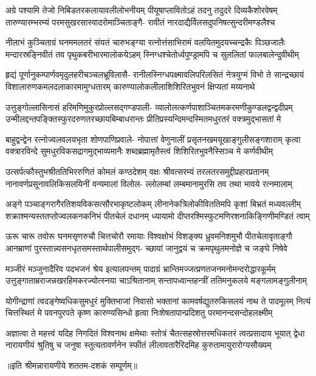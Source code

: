 

\fourlineindentedshloka
{अग्रे पश्यामि तेजो निबिडतरकलायावलीलोभनीयम्}
{पीयूषाप्लावितोऽहं तदनु तदुदरे दिव्यकैशोरवेषम्}
{तारुण्यारम्भरम्यं परमसुखरसास्वादरोमाञ्चिताङ्गै-}
{रावीतं नारदाद्यैर्विलसदुपनिषत्सुन्दरीमण्डलैश्च}

\fourlineindentedshloka
{नीलाभं कुञ्चिताग्रं घनममलतरं संयतं चारुभङ्ग्या}
{रत्नोत्तंसाभिरामं वलयितमुदयच्चन्द्रकैः पिञ्छजालैः}
{मन्दारस्रङ्निवीतं तव पृथुकबरीभारमालोकयेऽहम्}
{स्निग्धश्चेतोर्ध्वपुण्ड्रामपि च सुललितां फालबालेन्दुवीथीम्}

\fourlineindentedshloka
{हृद्यं पूर्णानुकम्पार्णवमृदुलहरीचञ्चलभ्रूविलासै-}
{रानीलस्निग्धपक्ष्मावलिपरिलसितं नेत्रयुग्मं विभो ते}
{सान्द्रच्छायं विशालारुणकमलदलाकारमामुग्धतारम्}
{कारुण्यालोकलीलाशिशिरितभुवनं क्षिप्यतां मय्यनाथे}

\fourlineindentedshloka
{उत्तुङ्गोल्लासिनासं हरिमणिमुकुरप्रोल्लसद्गण्डपाली-}
{व्यालोलत्कर्णपाशाञ्चितमकरमणीकुण्डलद्वन्द्वदीप्रम्}
{उन्मीलद्दन्तपङ्क्तिस्फुरदरुणतरच्छायबिम्बाधरान्तः}
{प्रीतिप्रस्यन्दिमन्दस्मितमधुरतरं वक्त्रमुद्भासतां मे}

\fourlineindentedshloka
{बाहुद्वन्द्वेन रत्नोज्वलवलयभृता शोणपाणिप्रवाले-}
{नोपात्तां वेणुनालीं प्रसृतनखमयूखाङ्गुलीसङ्गशाराम्}
{कृत्वा वक्त्रारविन्दे सुमधुरविकसद्रागमुद्भाव्यमानैः}
{शब्दब्रह्मामृतैस्त्वं शिशिरितभुवनैस्सिञ्च मे कर्णवीथीम्}

\fourlineindentedshloka
{उत्सर्पत्कौस्तुभश्रीततिभिररुणितं कोमलं कण्ठदेशम्}
{वक्षः श्रीवत्सरम्यं तरलतरसमुद्दीप्रहारप्रतानम्}
{नानावर्णप्रसूनावलिकिसलयिनीं वन्यमालां विलोल-}
{ल्लोलम्बां लम्बमानामुरसि तव तथा भावये रत्नमालाम्}

\fourlineindentedshloka
{अङ्गे पञ्चाङ्गरागैरतिशयविकसत्सौरभाकृष्टलोकम्}
{लीनानेकत्रिलोकीविततिमपि कृशां बिभ्रतं मध्यवल्लीम्}
{शक्राश्मन्यस्ततप्तोज्वलकनकनिभं पीतचेलं दधानम्}
{ध्यायामो दीप्तरश्मिस्फुटमणिरशनाकिङ्गिणीमण्डितं त्वाम्}

\fourlineindentedshloka
{ऊरू चारू तवोरू घनमसृणरुचौ चित्तचोरौ रमायाः}
{विश्वक्षोभं विशङ्क्य ध्रुवमनिशमुभौ पीतचेलावृताङ्गौ}
{आनम्राणां पुरस्तान्न्यसनधृतसमस्तार्थपालीसमुद्ग-}
{च्छायां जानुद्वयं च क्रमपृथुलमनोज्ञे च जङ्घे निषेवे}

\fourlineindentedshloka
{मञ्जीरं मञ्जुनादैरिव पदभजनं श्रेय इत्यालपन्तम्}
{पादाग्रं भ्रान्तिमज्जत्प्रणतजनमनोमन्दरोद्धारकूर्मम्}
{उत्तुङ्गाताम्रराजन्नखरहिमकरज्योत्स्नया चाऽश्रितानाम्}
{सन्तापध्वान्तहन्त्रीं ततिमनुकलये मङ्गलामङ्गुलीनाम्}

\fourlineindentedshloka
{योगीन्द्राणां त्वदङ्गेष्वधिकसुमधुरं मुक्तिभाजां निवासो}
{भक्तानां कामवर्षद्युतरुकिसलयं नाथ ते पादमूलम्}
{नित्यं चित्तस्थितं मे पवनपुरपते कृष्ण कारुण्यसिन्धो}
{हृत्वा निःशेषतापान्प्रदिशतु परमानन्दसन्दोहलक्ष्मीम्}

\fourlineindentedshloka
{अज्ञात्वा ते महत्त्वं यदिह निगदितं विश्वनाथ क्षमेथाः}
{स्तोत्रं चैतत्सहस्रोत्तरमधिकतरं त्वत्प्रसादाय भूयात्}
{द्वेधा नारायणीयं श्रुतिषु च जनुषा स्तुत्यतावर्णनेन}
{स्फीतं लीलावतारैरिदमिह कुरुतामायुरारोग्यसौख्यम्}

{॥इति श्रीमन्नारायणीये शततम-दशकं सम्पूर्णम्॥}
